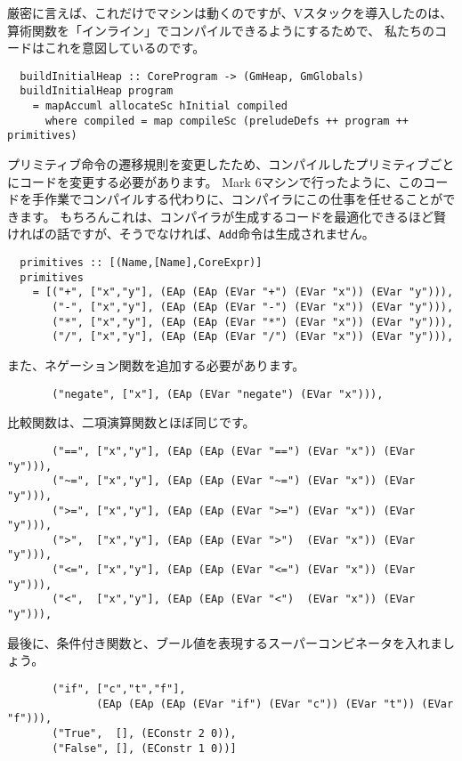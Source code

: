 \documentclass{jarticle}
\begin{document}
厳密に言えば、これだけでマシンは動くのですが、Vスタックを導入したのは、
算術関数を「インライン」でコンパイルできるようにするためで、
私たちのコードはこれを意図しているのです。

\begin{verbatim}
  buildInitialHeap :: CoreProgram -> (GmHeap, GmGlobals)
  buildInitialHeap program
    = mapAccuml allocateSc hInitial compiled
      where compiled = map compileSc (preludeDefs ++ program ++ primitives)
\end{verbatim}

プリミティブ命令の遷移規則を変更したため、コンパイルしたプリミティブごとにコードを変更する必要があります。
Mark 6マシンで行ったように、このコードを手作業でコンパイルする代わりに、コンパイラにこの仕事を任せることができます。
もちろんこれは、コンパイラが生成するコードを最適化できるほど賢ければの話ですが、そうでなければ、\texttt{Add}命令は生成されません。

\begin{verbatim}
  primitives :: [(Name,[Name],CoreExpr)]
  primitives
    = [("+", ["x","y"], (EAp (EAp (EVar "+") (EVar "x")) (EVar "y"))),
       ("-", ["x","y"], (EAp (EAp (EVar "-") (EVar "x")) (EVar "y"))),
       ("*", ["x","y"], (EAp (EAp (EVar "*") (EVar "x")) (EVar "y"))),
       ("/", ["x","y"], (EAp (EAp (EVar "/") (EVar "x")) (EVar "y"))),
\end{verbatim}

また、ネゲーション関数を追加する必要があります。

\begin{verbatim}
       ("negate", ["x"], (EAp (EVar "negate") (EVar "x"))),
\end{verbatim}

比較関数は、二項演算関数とほぼ同じです。

\begin{verbatim}
       ("==", ["x","y"], (EAp (EAp (EVar "==") (EVar "x")) (EVar "y"))),
       ("~=", ["x","y"], (EAp (EAp (EVar "~=") (EVar "x")) (EVar "y"))),
       (">=", ["x","y"], (EAp (EAp (EVar ">=") (EVar "x")) (EVar "y"))),
       (">",  ["x","y"], (EAp (EAp (EVar ">")  (EVar "x")) (EVar "y"))),
       ("<=", ["x","y"], (EAp (EAp (EVar "<=") (EVar "x")) (EVar "y"))),
       ("<",  ["x","y"], (EAp (EAp (EVar "<")  (EVar "x")) (EVar "y"))),
\end{verbatim}

最後に、条件付き関数と、ブール値を表現するスーパーコンビネータを入れましょう。

\begin{verbatim}
       ("if", ["c","t","f"],
              (EAp (EAp (EAp (EVar "if") (EVar "c")) (EVar "t")) (EVar "f"))),
       ("True",  [], (EConstr 2 0)),
       ("False", [], (EConstr 1 0))]
\end{verbatim}
\end{document}
